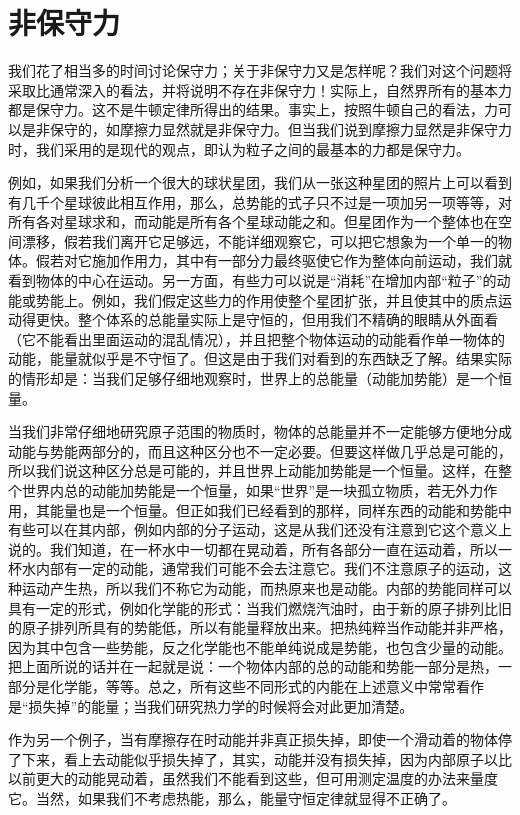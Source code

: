 \section{非保守力}

我们花了相当多的时间讨论保守力；关于非保守力又是怎样呢？我们对这个问题将采取比通常深入的看法，并将说明不存在非保守力！实际上，自然界所有的基本力都是保守力。这不是牛顿定律所得出的结果。事实上，按照牛顿自己的看法，力可以是非保守的，如摩擦力显然就是非保守力。但当我们说到摩擦力显然是非保守力时，我们采用的是现代的观点，即认为粒子之间的最基本的力都是保守力。

例如，如果我们分析一个很大的球状星团，我们从一张这种星团的照片上可以看到有几千个星球彼此相互作用，那么，总势能的式子只不过是一项加另一项等等，对所有各对星球求和，而动能是所有各个星球动能之和。但星团作为一个整体也在空间漂移，假若我们离开它足够远，不能详细观察它，可以把它想象为一个单一的物体。假若对它施加作用力，其中有一部分力最终驱使它作为整体向前运动，我们就看到物体的中心在运动。另一方面，有些力可以说是“消耗”在增加内部“粒子”的动能或势能上。例如，我们假定这些力的作用使整个星团扩张，并且使其中的质点运动得更快。整个体系的总能量实际上是守恒的，但用我们不精确的眼睛从外面看（它不能看出里面运动的混乱情况），并且把整个物体运动的动能看作单一物体的动能，能量就似乎是不守恒了。但这是由于我们对看到的东西缺乏了解。结果实际的情形却是：当我们足够仔细地观察时，世界上的总能量（动能加势能）是一个恒量。

当我们非常仔细地研究原子范围的物质时，物体的总能量并不一定能够方便地分成动能与势能两部分的，而且这种区分也不一定必要。但要这样做几乎总是可能的，所以我们说这种区分总是可能的，并且世界上动能加势能是一个恒量。这样，在整个世界内总的动能加势能是一个恒量，如果“世界”是一块孤立物质，若无外力作用，其能量也是一个恒量。但正如我们已经看到的那样，同样东西的动能和势能中有些可以在其内部，例如内部的分子运动，这是从我们还没有注意到它这个意义上说的。我们知道，在一杯水中一切都在晃动着，所有各部分一直在运动着，所以一杯水内部有一定的动能，通常我们可能不会去注意它。我们不注意原子的运动，这种运动产生热，所以我们不称它为动能，而热原来也是动能。内部的势能同样可以具有一定的形式，例如化学能的形式：当我们燃烧汽油时，由于新的原子排列比旧的原子排列所具有的势能低，所以有能量释放出来。把热纯粹当作动能并非严格，因为其中包含一些势能，反之化学能也不能单纯说成是势能，也包含少量的动能。把上面所说的话并在一起就是说：一个物体内部的总的动能和势能一部分是热，一部分是化学能，等等。总之，所有这些不同形式的内能在上述意义中常常看作是“损失掉”的能量；当我们研究热力学的时候将会对此更加清楚。

作为另一个例子，当有摩擦存在时动能并非真正损失掉，即使一个滑动着的物体停了下来，看上去动能似乎损失掉了，其实，动能并没有损失掉，因为内部原子以比以前更大的动能晃动着，虽然我们不能看到这些，但可用测定温度的办法来量度它。当然，如果我们不考虑热能，那么，能量守恒定律就显得不正确了。


